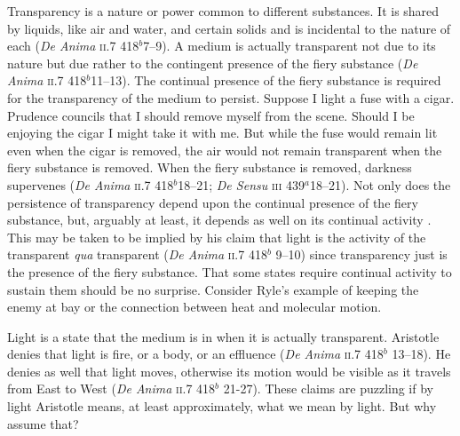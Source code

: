 \documentclass[12pt]{article}
\begin{document}
Transparency is a nature or power common to different substances. It is shared by liquids, like air and water, and certain solids and is incidental to the nature of each (\emph{De Anima} \textsc{ii}.7 418\( ^{b} \)7--9). A medium is actually transparent not due to its nature but due rather to the contingent presence of the fiery substance (\emph{De Anima} \textsc{ii}.7 418\( ^{b} \)11--13). The continual presence of the fiery substance is required for the transparency of the medium to persist. Suppose I light a fuse with a cigar. Prudence councils that I should remove myself from the scene. Should I be enjoying the cigar I might take it with me. But while the fuse would remain lit even when the cigar is removed, the air would not remain transparent when the fiery substance is removed. When the fiery substance is removed, darkness supervenes (\emph{De Anima} \textsc{ii}.7 418\( ^{b} \)18--21; \emph{De Sensu} \textsc{iii} 439\( ^{a} \)18--21). Not only does the persistence of transparency depend upon the continual presence of the fiery substance, but, arguably at least, it depends as well on its continual activity \citep[\emph{pace}][424]{Burnyeat:1995fk}. This may be taken to be implied by his claim that light is the activity of the transparent \emph{qua} transparent (\emph{De Anima} \textsc{ii}.7 418\( ^{b} \) 9--10) since transparency just is the presence of the fiery substance. That some states require continual activity to sustain them should be no surprise. Consider Ryle's \citeyearpar[149]{Ryle:1949qr} example of keeping the enemy at bay or the connection between heat and molecular motion.

Light is a state that the medium is in when it is actually transparent. Aristotle denies that light is fire, or a body, or an effluence (\emph{De Anima} \textsc{ii}.7 418\( ^{b} \) 13--18). He denies as well that light moves, otherwise its motion would be visible as it travels from East to West (\emph{De Anima} \textsc{ii}.7 418\( ^{b} \) 21-27). These claims are puzzling if by light Aristotle means, at least approximately, what we mean by light. But why assume that? 
\end{document}
